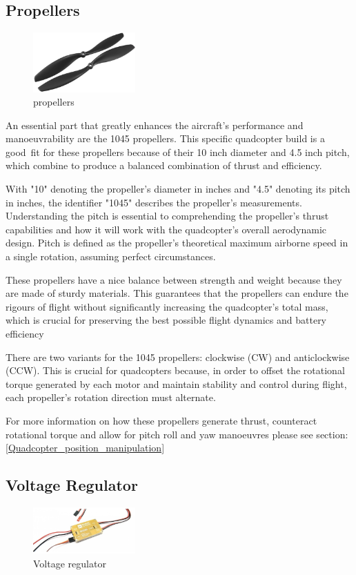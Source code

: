 \documentclass{article}
\begin{document}
\subsection{Propellers}
\begin{figure}[H]
  \centering
  \includegraphics[width=0.35\textwidth]{Pictures/props.png}
  \caption{propellers}
  \label{fig:propellers}
\end{figure}
An essential part that greatly enhances the aircraft's performance and
manoeuvrability are the 1045 propellers. This specific quadcopter build is a
good fit for these propellers because of their 10 inch diameter and 4.5 inch
pitch, which combine to produce a balanced combination of thrust and efficiency. 

With "10" denoting the propeller's diameter in inches and "4.5" denoting its
pitch in inches, the identifier "1045" describes the propeller's measurements.
Understanding the pitch is essential to comprehending the propeller's thrust
capabilities and how it will work with the quadcopter's overall aerodynamic
design. Pitch is defined as the propeller's theoretical maximum airborne speed
in a single rotation, assuming perfect circumstances.

These propellers have a nice balance between strength and weight because they
are made of sturdy materials. This guarantees that the propellers can endure the
rigours of flight without significantly increasing the quadcopter's total mass,
which is crucial for preserving the best possible flight dynamics and
battery efficiency 

There are two variants for the 1045 propellers: clockwise (CW) and anticlockwise
(CCW). This is crucial for quadcopters because, in order to offset the
rotational torque generated by each motor and maintain stability and control
during flight, each propeller's rotation direction must alternate.

For more information on how these propellers generate thrust, counteract
rotational torque and allow for pitch roll and yaw manoeuvres please see
section:\ref{Quadcopter_position_manipulation}
\subsection{Voltage Regulator}
\begin{figure}[H]
  \centering
  \includegraphics[width=0.35\textwidth]{Pictures/voltage_regulator.png}
  \caption{Voltage regulator}
  \label{fig:voltage_regulator}
\end{figure}
\end{document}
